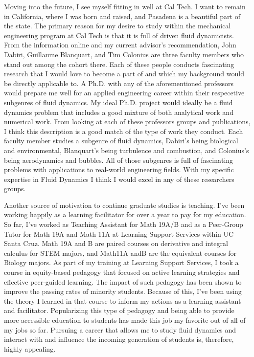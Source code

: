 \documentclass{article}
\begin{document}
Moving into the future, I see myself fitting in well at Cal Tech. I want to remain in California, where I was born and raised, and Pasadena is a beautiful part of the state. The primary reason for my desire to study within the mechanical engineering program at Cal Tech is that it is full of driven fluid dynamicists. From the information online and my current advisor's recommendation, John Dabiri, Guillaume Blanquart, and Tim Colonius are three faculty members who stand out among the cohort there. Each of these people conducts fascinating research that I would love to become a part of and which my background would be directly applicable to. A Ph.D. with any of the aforementioned professors would prepare me well for an applied engineering career within their respecetive subgenres of fluid dynamics. My ideal Ph.D. project would ideally be a fluid dynamics problem that includes a good mixture of both analytical work and numerical work. From looking at each of these professors groups and publications, I think this description is a good match of the type of work they conduct. Each faculty member studies a subgenre of fluid dynamics, Dabiri's being biological and environmental, Blanquart's being turbulence and combustion, and Colonius's being aerodynamics and bubbles. All of those subgenres is full of fascinating problems with applications to real-world engineering fields. With my specific expertise in Fluid Dynamics I think I would excel in any of these researchers groups. 

Another source of motivation to continue graduate studies is teaching. I've been working happily as a learning facilitator for over a year to pay for my education. So far, I've worked as Teaching Assistant for Math 19A/B and as a Peer-Group Tutor for Math 19A and Math 11A at Learning Support Services within UC Santa Cruz. Math 19A and B are paired courses on derivative and integral calculus for STEM majors, and Math11A andB are the equivalent courses for Biology majors. As part of my training at Learning Support Services, I took a course in equity-based pedagogy that focused on active learning strategies and effective peer-guided learning. The impact of such pedagogy has been shown to improve the passing rates of minority students. Because of this, I've been using the theory I learned in that course to inform my actions as a learning assistant and facilitator. Popularizing this type of pedagogy and being able to provide more accessible education to students has made this job my favorite out of all of my jobs so far. Pursuing a career that allows me to study fluid dynamics and interact with and influence the incoming generation of students is, therefore, highly appealing.
\end{document}
